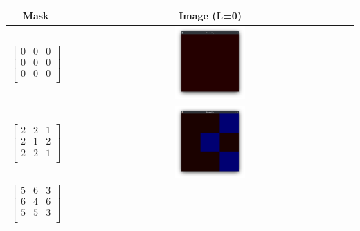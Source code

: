\begin{table}
    \centering
    \begin{tabular}{|c|c|}
        \hline
        Mask & Image (L=0) \\
        \hline
        \begin{equation*}
            \begin{bmatrix}
                0 & 0 & 0 \\
                0 & 0 & 0 \\
                0 & 0 & 0 \\
            \end{bmatrix}
        \end{equation*}
        &
        \includegraphics[width=0.25\textwidth]{./latex/img/m0}
        \\
        \hline
        \begin{equation*}
            \begin{bmatrix}
                2 & 2 & 1 \\
                2 & 1 & 2 \\
                2 & 2 & 1 \\
            \end{bmatrix}
        \end{equation*}
        &
        \includegraphics[width=0.25\textwidth]{./latex/img/m1}
        \\
        \hline
        \begin{equation*}
            \begin{bmatrix}
                5 & 6 & 3 \\
                6 & 4 & 6 \\
                5 & 5 & 3 \\
            \end{bmatrix}

\end{equation*}
\end{tabular}
\end{table}
